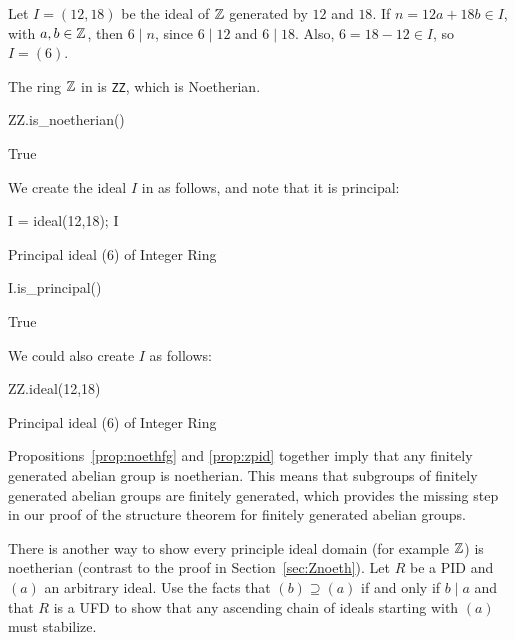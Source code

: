 \begin{example}
Let $I=(12,18)$ be the ideal of $\mathbb{Z}$ generated by $12$ and $18$.
If $n=12a+18b\in I$, with $a,b\in\mathbb{Z}$,
then $6\mid n$, since $6\mid 12$ and $6\mid 18$.
Also, $6=18-12\in I$, so $I=(6)$.

The ring $\mathbb{Z}$
in {\Sage} is {\tt ZZ}, which is Noetherian.
\begin{sagecode}
\begin{sagecell}
ZZ.is_noetherian()
\end{sagecell}
\begin{sageout}
True
\end{sageout}
\end{sagecode}
We create the ideal $I$ in {\Sage} as follows, and note that
it is principal:
\begin{sagecode}
\begin{sagecell}
I = ideal(12,18); I
\end{sagecell}
\begin{sageout}
Principal ideal (6) of Integer Ring
\end{sageout}
\begin{sagecell}
I.is_principal()
\end{sagecell}
\begin{sageout}
True
\end{sageout}
\end{sagecode}
We could also create $I$ as follows:
\begin{sagecode}
\begin{sagecell}
ZZ.ideal(12,18)
\end{sagecell}
\begin{sageout}
Principal ideal (6) of Integer Ring
\end{sageout}
\end{sagecode}
\end{example}

Propositions~\ref{prop:noethfg} and \ref{prop:zpid} together imply that
any finitely generated abelian group is noetherian.  This means that
subgroups of finitely generated abelian groups are finitely generated,
which provides the missing step in our proof of the structure theorem
for finitely generated abelian groups.

\begin{exercise}
  There is another way to show every principle ideal domain
  (for example $\mathbb{Z}$) is noetherian (contrast to the proof in
  Section~\ref{sec:Znoeth}). Let $R$ be a PID and $(a)$ an arbitrary ideal.
  Use the facts that $(b) \supseteq (a)$ if and only if $b \mid a$ and that $R$
  is a UFD to show that any ascending chain of ideals starting with $(a)$ must
  stabilize.
\end{exercise}

